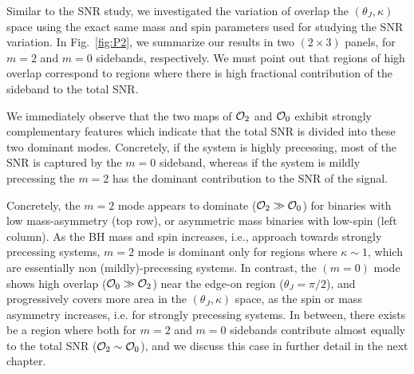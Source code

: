 Similar to the SNR study, we investigated the variation of overlap the
$(\theta_J, \kappa)$ space using the exact same mass and spin parameters used
for studying the SNR variation. In Fig.~\ref{fig:P2}, we summarize our results
in two $(2 \times 3)$ panels, for $m=2$ and $m=0$ sidebands, respectively. We
must point out that regions of high overlap correspond to regions where there
is high fractional contribution of the sideband to the total SNR.

We immediately observe that the two maps of ${\cal{O}}_2$ and ${\cal{O}}_0$
exhibit strongly complementary features which indicate that the total SNR is
divided into these two dominant modes. Concretely, if the
system is highly precessing, most of the SNR is captured by the $m=0$
sideband, whereas if the system is mildly precessing the $m=2$ has the
dominant contribution to the SNR of the signal.  

Concretely, the $m=2$ mode appears to dominate (${\cal O}_2 \gg {\cal O}_0$)
for binaries with low mass-asymmetry (top row), or asymmetric mass binaries
with low-spin (left column). As the BH mass and spin increases, i.e., approach
towards strongly precessing systems, $m=2$ mode is dominant only for regions
where $\kappa \sim 1$, which are essentially non (mildly)-precessing systems.
In contrast, the $(m=0)$ mode shows high overlap (${\cal O}_0 \gg {\cal O}_2$)
near the edge-on region ($\theta_J=\pi/2$), and progressively covers more area
in the $(\theta_J, \kappa)$ space, as the spin or mass asymmetry increases,
i.e. for strongly precessing systems. In between, there exists be a region
where both for $m=2$ and $m=0$ sidebands contribute almost equally to the
total SNR (${\cal O}_2 \sim {\cal O}_0$), and we discuss this case in further
detail in the next chapter.


